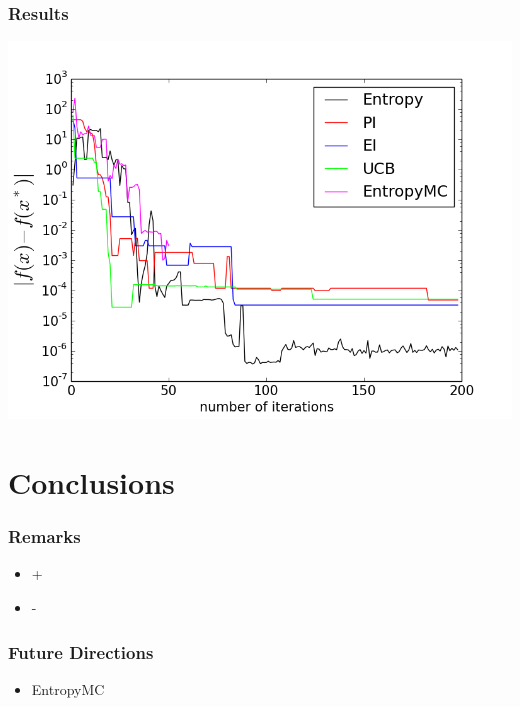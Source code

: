\documentclass[10pt,handout]{beamer}
\begin{document}
\begin{frame}
\frametitle{Results}

\includegraphics[width=\textwidth]{plot_branin1.png}

\end{frame}


\section{Conclusions}


\begin{frame}
\frametitle{Remarks}

\begin{itemize}[<+->]
	\item +
	\item -

\end{itemize}


\end{frame}


\begin{frame}
\frametitle{Future Directions}

\begin{itemize}
	\item EntropyMC
\end{itemize}

\end{frame}
\end{document}
